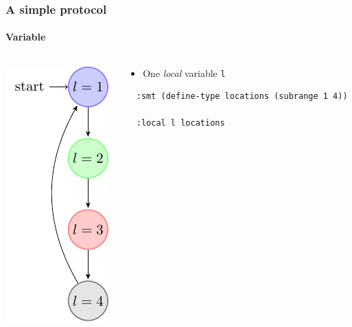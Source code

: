 \begin{frame}[fragile]
  \frametitle{A simple protocol}
  \framesubtitle{Variable}

\begin{columns}
\begin{column}{0.3\textwidth}
\centering
\includegraphics{pictures/demo-prot1-fig}
\end{column}

\begin{column}{0.7\textwidth}
  \begin{itemize}
    \item One {\it local} variable {\tt l}
  \end{itemize}
{\small  
  \begin{verbatim}
  :smt (define-type locations (subrange 1 4))

  :local l locations
  \end{verbatim}
}
\end{column}

\end{columns}  

\end{frame}

